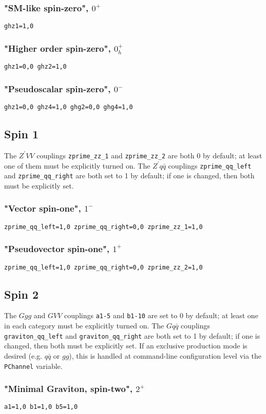 \documentclass[aps,superscriptaddress,nofootinbib]{revtex4}
\begin{document}
\subsubsection{"SM-like spin-zero", \texorpdfstring{$0^+$}{0+}}
\verb|ghz1=1,0|
\subsubsection{"Higher order spin-zero", \texorpdfstring{$0_h^+$}{0h+}}
\verb|ghz1=0,0 ghz2=1,0|
\subsubsection{"Pseudoscalar spin-zero", \texorpdfstring{$0^-$}{0-}}
\verb|ghz1=0,0 ghz4=1,0 ghg2=0,0 ghg4=1,0|
\subsection{Spin 1}
The $Z^\prime VV$ couplings \verb|zprime_zz_1| and \verb|zprime_zz_2| are both 0 by default; at least one of them must be explicitly turned on.  The $Z^{\prime}q\bar{q}$ couplings \verb|zprime_qq_left| and \verb|zprime_qq_right| are both set to 1 by default; if one is changed, then both must be explicitly set.
\subsubsection{"Vector spin-one", \texorpdfstring{$1^-$}{1-}}
\verb|zprime_qq_left=1,0 zprime_qq_right=0,0 zprime_zz_1=1,0|
\subsubsection{"Pseudovector spin-one", \texorpdfstring{$1^+$}{1+}}
\verb|zprime_qq_left=1,0 zprime_qq_right=0,0 zprime_zz_2=1,0|
\subsection{Spin 2}
The $Ggg$ and $GVV$ couplings \verb|a1-5| and \verb|b1-10| are set to 0 by default; at least one in each category must be explicitly turned on.  The $Gq\bar{q}$ couplings \verb|graviton_qq_left| and \verb|graviton_qq_right| are both set to 1 by default; if one is changed, then both must be explicitly set.
If an exclusive production mode is desired (e.g. $q\bar{q}$ or $gg$), this is handled at command-line configuration level via the \verb|PChannel| variable.
\subsubsection{"Minimal Graviton, spin-two", \texorpdfstring{$2^+$}{2+}}
\verb|a1=1,0 b1=1,0 b5=1,0|
\end{document}
